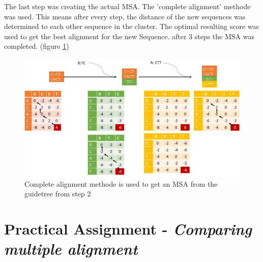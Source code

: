 \documentclass[%
   10pt,              %
   nenglish,           %
   a4paper,           %
   DIV11,             %
]{scrartcl}%
\begin{document}
The last step was creating the actual MSA. The 'complete alignment' methode was used. This means after every step, the distance of the new sequences was determined to each other sequence in the cluster. The optimal resulting score was used to get the best alignment for the new Sequence. after 3 steps the MSA was completed. (figure \ref{completealign})
\begin{figure}[h]
	\includegraphics[width=\textwidth]{Img/Exercise2-CompleteAlignment.png}
	\caption{ Complete alignment methode is used to get an MSA from the guidetree from step 2	}
	\label{completealign}
\end{figure}
\section*{Practical Assignment - \textsl{Comparing multiple alignment}}
 
\end{document}
